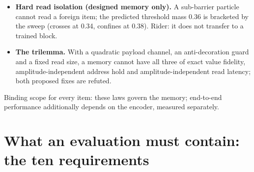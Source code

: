 \documentclass{article} %
\begin{document}
\begin{itemize}
  memory 6.3 KB against 6.00 MB at $T=1024$; exact only at zero damping. %
\item \textbf{Hard read isolation (designed memory only).} A sub-barrier particle cannot read a
  foreign item; the predicted threshold mass 0.36 is bracketed by the sweep (crosses at 0.34,
  confines at 0.38). Rider: it does not transfer to a trained block. %
\item \textbf{The trilemma.} With a quadratic payload channel, an anti-decoration guard and a fixed
read size, a memory cannot have all three of exact value fidelity, amplitude-independent address
  hold and amplitude-independent read latency; both proposed fixes are refuted.
\end{itemize}
Binding scope for every item: these laws govern the memory; end-to-end performance additionally
depends on the encoder, measured separately. %

\section{What an evaluation must contain: the ten requirements}
\label{app:bench}
\end{document}
